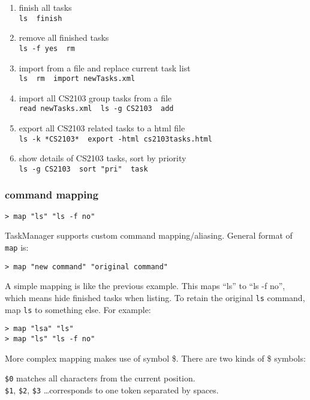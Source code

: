 \documentclass[12pt, a4paper]{article}
\begin{document}
\begin{enumerate}
\item finish all tasks\\
  \texttt{ls \textbar \  finish}
\item remove all finished tasks\\
  \texttt{ls -f yes \textbar \  rm}
\item import from a file and replace current task list\\
  \texttt{ls \textbar \  rm \textbar \  import newTasks.xml}
\item import all CS2103 group tasks from a file\\
  \texttt{read newTasks.xml \textbar \  ls -g CS2103 \textbar \  add}
\item export all CS2103 related tasks to a html file\\
  \texttt{ls -k *CS2103* \textbar \  export -html cs2103tasks.html}
\item show details of CS2103 tasks, sort by priority\\
  \texttt{ls -g CS2103 \textbar \  sort "pri" \textbar \  task}
\end{enumerate}

\subsubsection{command mapping}

\noindent \texttt{\textgreater \ map "ls" "ls -f no"}

TaskManager supports custom command mapping/aliasing. General format of \texttt{map} is:

\noindent \texttt{\textgreater \ map "new command" "original command"}

A simple mapping is like the previous example. This maps ``ls'' to ``ls -f no'', which means hide finished tasks when listing.
To retain the original \texttt{ls} command, map \texttt{ls} to something else. For example:

\noindent \texttt{\textgreater \ map "lsa" "ls"\\
  \textgreater \ map "ls" "ls -f no"\footnotemark}


More complex mapping makes use of symbol \$. There are two kinds of \$ symbols:

\texttt{\$0} matches all characters from the current position.\\
\texttt{\$1}, \texttt{\$2}, \texttt{\$3} \ldots corresponds to one token separated by spaces.
\end{document}
